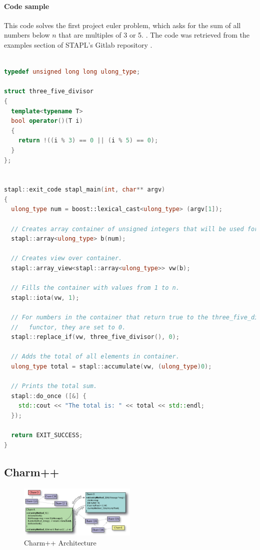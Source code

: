 \paragraph{Code sample}
This code solves the first project euler problem, which asks for the sum of all numbers below $n$ that are multiples of 3 or 5. \cite{euler_1}. The code was retrieved from the examples section of STAPL's Gitlab repository \cite{stapl_gitlab}.  
\scriptsize
\begin{lstlisting}[language=C++, caption=STAPL code sample for Project Euler number 1. Headers and doxygen comments removed for brevity, captionpos=b]

typedef unsigned long long ulong_type;

struct three_five_divisor
{
  template<typename T>
  bool operator()(T i)
  {
    return !((i % 3) == 0 || (i % 5) == 0);
  }
};


stapl::exit_code stapl_main(int, char** argv)
{
  ulong_type num = boost::lexical_cast<ulong_type> (argv[1]);

  // Creates array container of unsigned integers that will be used for storage.
  stapl::array<ulong_type> b(num);

  // Creates view over container.
  stapl::array_view<stapl::array<ulong_type>> vw(b);

  // Fills the container with values from 1 to n.
  stapl::iota(vw, 1);

  // For numbers in the container that return true to the three_five_divisor
  //   functor, they are set to 0.
  stapl::replace_if(vw, three_five_divisor(), 0);

  // Adds the total of all elements in container.
  ulong_type total = stapl::accumulate(vw, (ulong_type)0);

  // Prints the total sum.
  stapl::do_once ([&] {
    std::cout << "The total is: " << total << std::endl;
  });

  return EXIT_SUCCESS;
} \end{lstlisting}
\normalsize
\subsection{Charm++}
\begin{figure}[h]
	\centering
	\includegraphics[width=0.5\textwidth]{Figures/charm_arch.jpg}
	\caption{Charm++ Architecture \cite{charm_tutorial}}
	\label{fig:charm_arch}
\end{figure}

